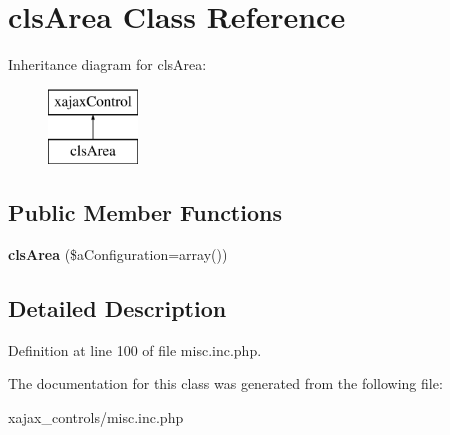 \hypertarget{classclsArea}{
\section{clsArea Class Reference}
\label{classclsArea}
}
Inheritance diagram for clsArea:\begin{figure}[H]
\begin{center}
\leavevmode
\includegraphics[height=2.000000cm]{classclsArea}
\end{center}
\end{figure}
\subsection*{Public Member Functions}
\begin{DoxyCompactItemize}
\item 
\hypertarget{classclsArea_a87097628cd924f11179a1f6975a9203f}{
{\bfseries clsArea} (\$aConfiguration=array())}
\label{classclsArea_a87097628cd924f11179a1f6975a9203f}

\end{DoxyCompactItemize}


\subsection{Detailed Description}


Definition at line 100 of file misc.inc.php.



The documentation for this class was generated from the following file:\begin{DoxyCompactItemize}
\item 
xajax\_\-controls/misc.inc.php\end{DoxyCompactItemize}

